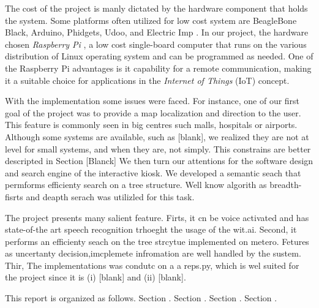 The cost of the project is manly dictated by the hardware component that holds the system.
Some platforms often utilized for low cost system are BeagleBone Black,  Arduino,  Phidgets, Udoo, and Electric Imp \cite{kubitza2013ingredients,pi2012raspberry}.
In our project, the hardware chosen \emph{Raspberry Pi} \cite{pi2012raspberry}, a low cost single-board computer that runs on the various distribution of Linux operating system and can be programmed as needed.
One of the Raspberry Pi advantages is it capability for a remote communication, making it a suitable choice for applications in the \emph{Internet of Things} (IoT) concept.

With the implementation some issues were faced.
For instance, one of our first goal of the project was to provide a map localization and direction to the user.
This feature is commonly seen in big centres such malls, hospitals or airports.
Although some systems are available, such as [blank], we realized they are not at level for small systems, and when they are, not simply. This constrains are better descripted in Section [Blanck]
We then turn our attentions for the software design and search engine of the interactive kiosk.
We developed a semantic seach that permforms efficienty search on a tree structure.
Well know algorith as breadth-fisrts and deapth serach was utilizled for this task.

The project presents many salient feature.
Firts, it cn be voice activated and has state-of-the art speech recognition trhoeght the usage of the wit.ai.
Second, it performs an efficienty seach on the tree strcytue implemented on metero. 
Fetures as uncertanty decision,imcplemete infromation are well handled by the sustem.
Thir, The implementations was condutc on a a reps.py, which is wel suited for the project since it is (i) [blank] and (ii) [blank].


This report is organized as follows.
Section .
Section .
Section .
Section .


